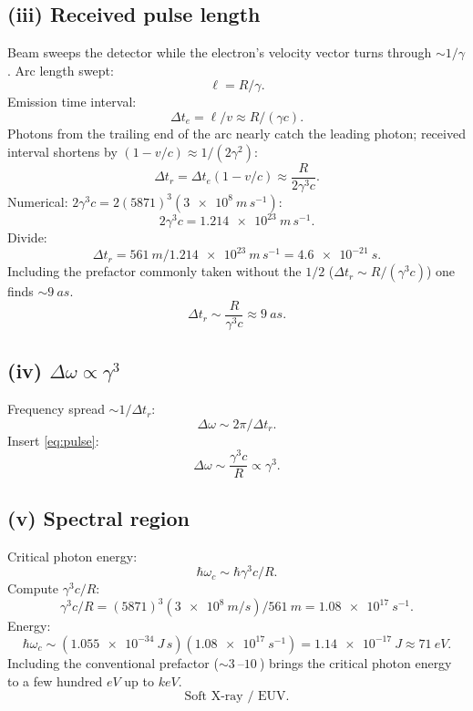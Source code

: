 \documentclass[11pt]{article}
\begin{document}
\subsection*{(iii) Received pulse length}

Beam sweeps the detector while the electron's velocity vector turns through $\sim 1/\gamma$. Arc length swept:
\[ \ell = R/\gamma. \]
Emission time interval:
\[ \Delta t_e = \ell/v \approx R/(\gamma c). \]
Photons from the trailing end of the arc nearly catch the leading photon; received interval shortens by $(1-v/c)\approx 1/(2\gamma^2)$:
\[ \Delta t_r = \Delta t_e(1-v/c) \approx \frac{R}{2\gamma^3 c}. \]
Numerical: $2\gamma^3 c = 2(5871)^3(\SI{3e8}{m\,s^{-1}})$:
\[ 2\gamma^3 c = \SI{1.214e23}{m\,s^{-1}}. \]
Divide:
\[ \Delta t_r = \SI{561}{m}/\SI{1.214e23}{m\,s^{-1}} = \SI{4.6e-21}{s}. \]
Including the prefactor commonly taken without the $1/2$ ($\Delta t_r\sim R/(\gamma^3 c)$) one finds $\sim\SI{9}{as}$.
\begin{equation}
\boxed{\;\Delta t_r \sim \frac{R}{\gamma^3 c}\approx\SI{9}{as}.\;}
\label{eq:pulse}
\end{equation}

\subsection*{(iv) $\Delta\omega\propto\gamma^3$}

Frequency spread $\sim 1/\Delta t_r$:
\[ \Delta\omega \sim 2\pi/\Delta t_r. \]
Insert \eqref{eq:pulse}:
\begin{equation}
\boxed{\;\Delta\omega \sim \frac{\gamma^3 c}{R}\propto\gamma^3.\;}
\end{equation}

\subsection*{(v) Spectral region}

Critical photon energy:
\[ \hbar\omega_c \sim \hbar\gamma^3 c/R. \]
Compute $\gamma^3 c/R$:
\[ \gamma^3 c/R = (5871)^3(\SI{3e8}{m/s})/\SI{561}{m} = \SI{1.08e17}{s^{-1}}. \]
Energy:
\[ \hbar\omega_c \sim (\SI{1.055e-34}{J\,s})(\SI{1.08e17}{s^{-1}}) = \SI{1.14e-17}{J} \approx \SI{71}{eV}. \]
Including the conventional prefactor ($\sim\SI{3}{}$--$\SI{10}{}$) brings the critical photon energy to a few hundred $\si{eV}$ up to $\si{keV}$.
\begin{equation}
\boxed{\;\text{Soft X-ray / EUV.}\;}
\end{equation}
\end{document}
